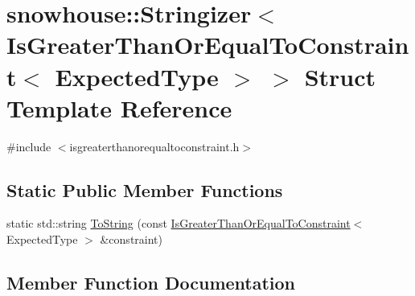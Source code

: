 \hypertarget{structsnowhouse_1_1Stringizer_3_01IsGreaterThanOrEqualToConstraint_3_01ExpectedType_01_4_01_4}{}\section{snowhouse\+::Stringizer$<$ Is\+Greater\+Than\+Or\+Equal\+To\+Constraint$<$ Expected\+Type $>$ $>$ Struct Template Reference}
\label{structsnowhouse_1_1Stringizer_3_01IsGreaterThanOrEqualToConstraint_3_01ExpectedType_01_4_01_4}


{\ttfamily \#include $<$isgreaterthanorequaltoconstraint.\+h$>$}

\subsection*{Static Public Member Functions}
\begin{DoxyCompactItemize}
\item 
static std\+::string \mbox{\hyperlink{structsnowhouse_1_1Stringizer_3_01IsGreaterThanOrEqualToConstraint_3_01ExpectedType_01_4_01_4_ac27c400844e6d21db555f77b1128ec4a}{To\+String}} (const \mbox{\hyperlink{structsnowhouse_1_1IsGreaterThanOrEqualToConstraint}{Is\+Greater\+Than\+Or\+Equal\+To\+Constraint}}$<$ Expected\+Type $>$ \&constraint)
\end{DoxyCompactItemize}


\subsection{Member Function Documentation}
\mbox{\label{structsnowhouse_1_1Stringizer_3_01IsGreaterThanOrEqualToConstraint_3_01ExpectedType_01_4_01_4_ac27c400844e6d21db555f77b1128ec4a}} 
